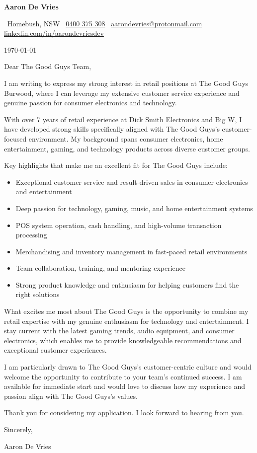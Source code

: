 \documentclass[a4paper,10pt]{article}
\makeatletter
\providecommand{\ContactBlock}{}
\renewcommand{\ContactBlock}{%
  {\Large \textbf{Aaron De Vries}}\par
  {\color{MidBlue}\small
  \faIcon{map-marker-alt}\, Homebush, NSW \quad\textbar\quad
  \faIcon{phone}\, \href{tel:+61400375308}{0400 375 308} \quad\textbar\quad
  \faIcon{envelope}\, \href{mailto:aarondevries@protonmail.com}{aarondevries@protonmail.com} \quad\textbar\quad
  \faIcon[brands]{linkedin}\, \href{https://linkedin.com/in/aarondevriesdev}{linkedin.com/in/aarondevriesdev}%
  }\par
}
\makeatother
\begin{document}
\ContactBlock

\vspace{1em}

\today

\vspace{1em}

Dear The Good Guys Team,

I am writing to express my strong interest in retail positions at The Good Guys Burwood, where I can leverage my extensive customer service experience and genuine passion for consumer electronics and technology.

With over 7 years of retail experience at Dick Smith Electronics and Big W, I have developed strong skills specifically aligned with The Good Guys's customer-focused environment. My background spans consumer electronics, home entertainment, gaming, and technology products across diverse customer groups.

Key highlights that make me an excellent fit for The Good Guys include:
\begin{itemize}
\item Exceptional customer service and result-driven sales in consumer electronics and entertainment
\item Deep passion for technology, gaming, music, and home entertainment systems
\item POS system operation, cash handling, and high-volume transaction processing
\item Merchandising and inventory management in fast-paced retail environments
\item Team collaboration, training, and mentoring experience
\item Strong product knowledge and enthusiasm for helping customers find the right solutions
\end{itemize}

What excites me most about The Good Guys is the opportunity to combine my retail expertise with my genuine enthusiasm for technology and entertainment. I stay current with the latest gaming trends, audio equipment, and consumer electronics, which enables me to provide knowledgeable recommendations and exceptional customer experiences.

I am particularly drawn to The Good Guys's customer-centric culture and would welcome the opportunity to contribute to your team's continued success. I am available for immediate start and would love to discuss how my experience and passion align with The Good Guys's values.

Thank you for considering my application. I look forward to hearing from you.

Sincerely,

Aaron De Vries
\end{document}
